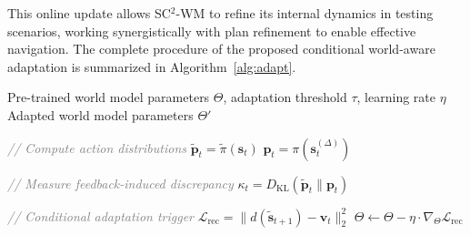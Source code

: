 \documentclass{article}
\theoremstyle{plain}
\theoremstyle{definition}
\theoremstyle{remark}
\begin{document}
This online update allows SC$^{2}$-WM to refine its internal dynamics in testing scenarios, working synergistically with plan refinement to enable effective navigation.
The complete procedure of the proposed conditional world-aware adaptation is summarized in Algorithm~\ref{alg:adapt}.

\begin{algorithm}[htbp]
\caption{Conditional World-Aware Adaptation \textit{(Test-Time)}}
\label{alg:adapt}
\begin{algorithmic}[1]
\REQUIRE Pre-trained world model parameters \(\Theta\), adaptation threshold \(\tau\), learning rate \(\eta\)
\ENSURE Adapted world model parameters \(\Theta'\)

    \STATE \textcolor{gray}{\textit{// Compute action distributions}}
    \STATE \(\boldsymbol{\tilde{p}}_t = \tilde{\pi}(\boldsymbol{s}_t)\)
    \STATE \(\boldsymbol{p}_t = \pi(\boldsymbol{s}_t^{(\Delta)})\)
    
    \STATE \textcolor{gray}{\textit{// Measure feedback-induced discrepancy}}
    \STATE \(\kappa_t = D_{\mathrm{KL}}\!\left(\boldsymbol{\tilde{p}}_t \parallel \boldsymbol{{p}}_t \right)\)
    
    \STATE \textcolor{gray}{\textit{// Conditional adaptation trigger}}
        \STATE \(\mathcal{L}_{\mathrm{rec}} = \| d(\boldsymbol{\tilde{s}}_{t+1}) - \boldsymbol{\hat{v}}_t \|_2^2\)
        \STATE \(\Theta \leftarrow \Theta - \eta \cdot \nabla_{\Theta} \mathcal{L}_{\mathrm{rec}}\)
    \ENDIF
\ENDFOR
\end{algorithmic}
\end{algorithm}
\end{document}
